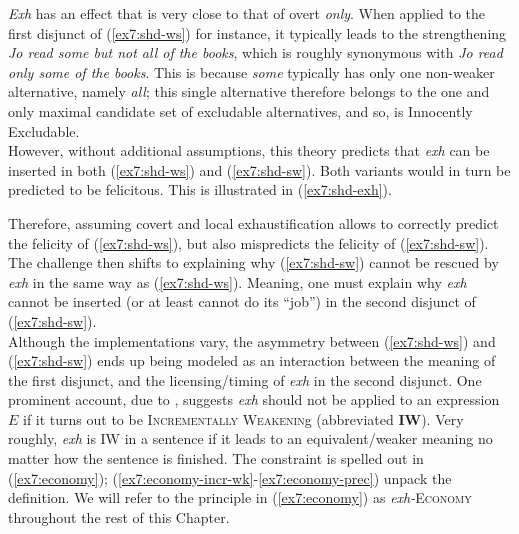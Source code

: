 \textit{Exh} has an effect that is very close to that of overt \textit{only}. When applied to the first disjunct of (\ref{ex7:shd-ws}) for instance, it typically leads to the strengthening \textit{Jo read some but not all of the books}, which is roughly synonymous with \textit{Jo read only some of the books}. This is because \textit{some} typically has only one non-weaker alternative, namely \textit{all}; this single alternative therefore belongs to the one and only maximal candidate set of excludable alternatives, and so, is Innocently Excludable.\\

However, without additional assumptions, this theory predicts that \textit{exh} can be inserted in both (\ref{ex7:shd-ws}) and (\ref{ex7:shd-sw}). Both variants would in turn be predicted to be felicitous. This is illustrated in (\ref{ex7:shd-exh}).

\begin{exe}
	\ex\label{ex7:shd-exh}
	\begin{xlist}
		\label{ex7:shd-ws-exh}
		\label{ex7:shd-sw-exh}
	\end{xlist}
\end{exe}

Therefore, assuming covert and local exhaustification allows to correctly predict the felicity of (\ref{ex7:shd-ws}), but also mispredicts the felicity of (\ref{ex7:shd-sw}). The challenge then shifts to explaining why (\ref{ex7:shd-sw}) cannot be rescued by \textit{exh} in the same way as (\ref{ex7:shd-ws}). Meaning, one must explain why \textit{exh} cannot be inserted (or at least cannot do its ``job'') in the second disjunct of (\ref{ex7:shd-sw}). \\

Although the implementations vary, the asymmetry between (\ref{ex7:shd-ws}) and (\ref{ex7:shd-sw}) ends up being modeled as an interaction between the meaning of the first disjunct, and the licensing/timing of \textit{exh} in the second disjunct. One prominent account, due to \citet{Fox2018}, suggests \textit{exh} should not be applied to an expression $E$ if it turns out to be \textsc{Incrementally Weakenin}g (abbreviated \textbf{IW}). Very roughly, \textit{exh} is IW in a sentence if it leads to an equivalent/weaker meaning no matter how the sentence is finished. The constraint is spelled out in (\ref{ex7:economy}); (\ref{ex7:economy-incr-wk}-\ref{ex7:economy-prec}) unpack the definition. We will refer to the principle in (\ref{ex7:economy}) as \textit{exh-}\textsc{Economy} throughout the rest of this Chapter.\\

